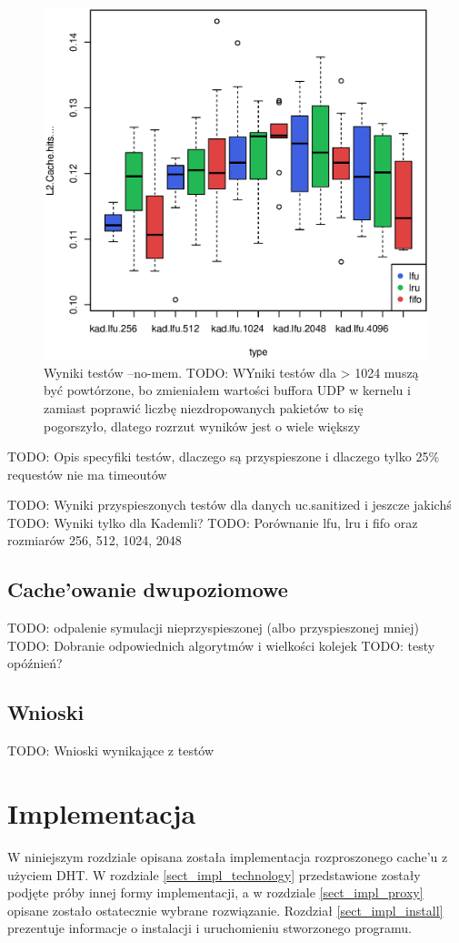 \documentclass[a4paper,11pt]{scrartcl}
\newcommand{\s}{ }
\newcommand{\keszu}{cache'u}
\newcommand{\Keszowanie}{Cache'owanie}
\begin{document}
\begin{figure}[h!]
\includegraphics[width=0.95\linewidth]{img/cache.eps}
\caption{Wyniki testów --no-mem. TODO: WYniki testów dla > 1024 muszą być powtórzone, bo zmieniałem wartości buffora UDP w kernelu i zamiast poprawić liczbę niezdropowanych pakietów to się pogorszyło, dlatego rozrzut wyników jest o wiele większy}
\end{figure}

TODO: Opis specyfiki testów, dlaczego są przyspieszone i dlaczego tylko 25\% requestów nie ma timeoutów

TODO: Wyniki przyspieszonych testów dla danych uc.sanitized i jeszcze jakichś
TODO: Wyniki tylko dla Kademli?
TODO: Porównanie lfu, lru i fifo oraz rozmiarów 256, 512, 1024, 2048


\subsection{\Keszowanie\s dwupoziomowe}
TODO: odpalenie symulacji nieprzyspieszonej (albo przyspieszonej mniej)
TODO: Dobranie odpowiednich algorytmów i wielkości kolejek
TODO: testy opóźnień?

\subsection{Wnioski}
TODO: Wnioski wynikające z testów

\section{Implementacja}
W niniejszym rozdziale opisana została implementacja rozproszonego \keszu\s z użyciem DHT. W rozdziale \ref{sect_impl_technology}
przedstawione zostały podjęte próby innej formy implementacji, a w rozdziale \ref{sect_impl_proxy} opisane zostało ostatecznie wybrane rozwiązanie.
Rozdział \ref{sect_impl_install} prezentuje informacje o instalacji i uruchomieniu stworzonego programu.
\end{document}

